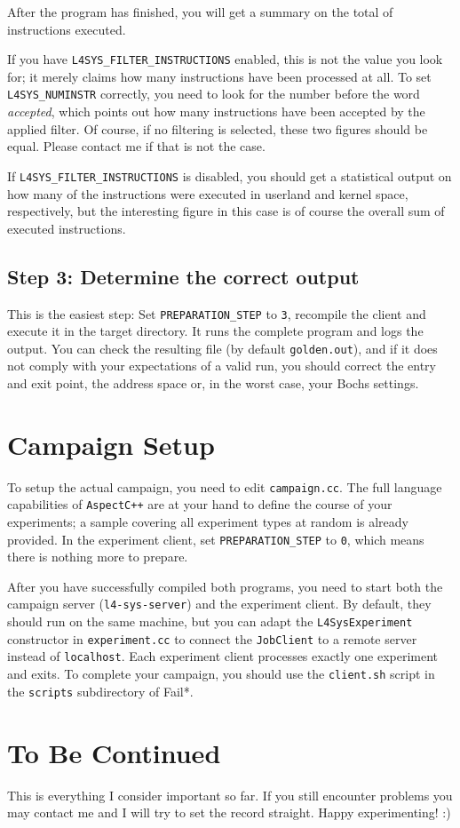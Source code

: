 \documentclass[a4paper,10pt]{article}
\begin{document}
After the program has finished, you will get a summary on the
total of instructions executed.

If you have
\verb+L4SYS_FILTER_INSTRUCTIONS+ enabled, this is not the
value you look for; it merely claims how many
instructions have been processed at all.
To set \verb+L4SYS_NUMINSTR+ correctly, you need to look for the
number before the word \emph{accepted}, which points out how many
instructions have been accepted by the applied filter. Of course,
if no filtering is selected, these two figures should be equal.
Please contact me if that is not the case.

If \verb+L4SYS_FILTER_INSTRUCTIONS+ is disabled, you should
get a statistical output on how many of the instructions
were executed in userland and kernel space, respectively,
but the interesting figure in this case is of course the overall
sum of executed instructions.

\subsection{Step 3: Determine the correct output}

This is the easiest step: Set \verb+PREPARATION_STEP+ to \texttt{3},
recompile the client and execute it in the target directory.
It runs the complete program and logs the output. You can
check the resulting file (by default \texttt{golden.out}),
and if it does not comply with your expectations of a valid
run, you should correct the entry and exit point, the address space
or, in the worst case, your Bochs settings.

\section{Campaign Setup}

To setup the actual campaign, you need to edit \texttt{campaign.cc}.
The full language capabilities of \texttt{AspectC++} are at your hand to define
the course of your experiments; a sample covering all experiment
types at random is already provided. In the experiment client,
set \verb+PREPARATION_STEP+ to \texttt{0}, which means there is nothing more
to prepare.

After you have successfully compiled both programs, you need to
start both the campaign server (\texttt{l4-sys-server})
and the experiment client. By default, they should run on the
same machine, but you can adapt the \texttt{L4SysExperiment}
constructor in \texttt{experiment.cc} to connect the \texttt{JobClient}
to a remote server instead of \texttt{localhost}. Each experiment client processes
exactly one experiment and exits. To complete your campaign,
you should use the \texttt{client.sh} script in the \texttt{scripts}
subdirectory of Fail*.

\section{To Be Continued}

This is everything I consider important so far. If you still encounter
problems you may
contact me and I will try to set the record straight.
Happy experimenting! :)
\end{document}
